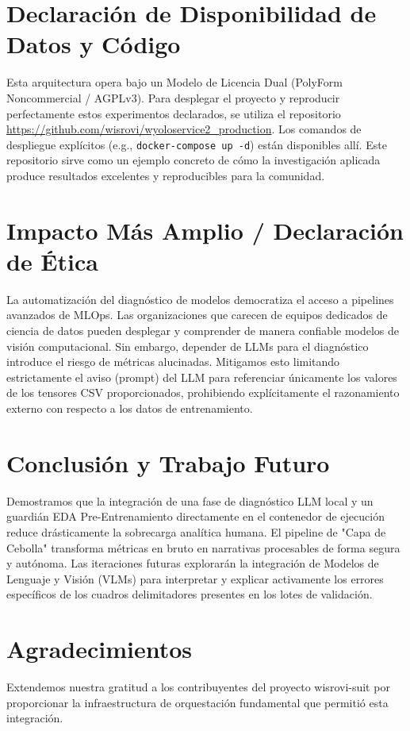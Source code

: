 \documentclass[10pt,twocolumn,letterpaper]{article}
\begin{document}
\section{Declaración de Disponibilidad de Datos y Código}
Esta arquitectura opera bajo un Modelo de Licencia Dual (PolyForm Noncommercial / AGPLv3). Para desplegar el proyecto y reproducir perfectamente estos experimentos declarados, se utiliza el repositorio \url{https://github.com/wisrovi/wyoloservice2_production}. Los comandos de despliegue explícitos (e.g., \texttt{docker-compose up -d}) están disponibles allí. Este repositorio sirve como un ejemplo concreto de cómo la investigación aplicada produce resultados excelentes y reproducibles para la comunidad.

\section{Impacto Más Amplio / Declaración de Ética}
La automatización del diagnóstico de modelos democratiza el acceso a pipelines avanzados de MLOps. Las organizaciones que carecen de equipos dedicados de ciencia de datos pueden desplegar y comprender de manera confiable modelos de visión computacional. Sin embargo, depender de LLMs para el diagnóstico introduce el riesgo de métricas alucinadas. Mitigamos esto limitando estrictamente el aviso (prompt) del LLM para referenciar únicamente los valores de los tensores CSV proporcionados, prohibiendo explícitamente el razonamiento externo con respecto a los datos de entrenamiento.

\section{Conclusión y Trabajo Futuro}
Demostramos que la integración de una fase de diagnóstico LLM local y un guardián EDA Pre-Entrenamiento directamente en el contenedor de ejecución reduce drásticamente la sobrecarga analítica humana. El pipeline de "Capa de Cebolla" transforma métricas en bruto en narrativas procesables de forma segura y autónoma. Las iteraciones futuras explorarán la integración de Modelos de Lenguaje y Visión (VLMs) para interpretar y explicar activamente los errores específicos de los cuadros delimitadores presentes en los lotes de validación.

\section{Agradecimientos}
Extendemos nuestra gratitud a los contribuyentes del proyecto wisrovi-suit por proporcionar la infraestructura de orquestación fundamental que permitió esta integración.



\end{document}
